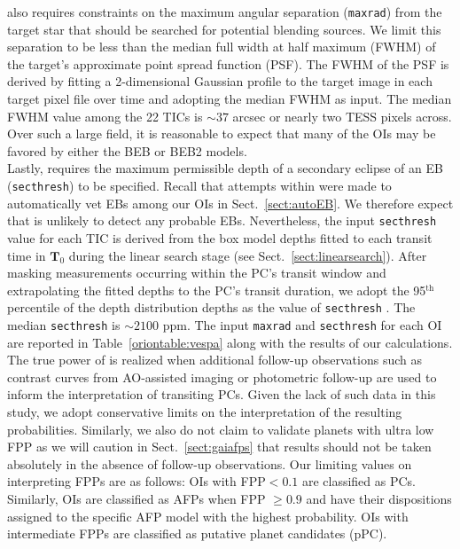\vespa{} also requires constraints on the maximum angular separation
(\texttt{maxrad}) from the target star that
should be searched for potential blending sources. We limit this separation to be less than the median
full width at half maximum (FWHM) of the target's approximate point spread function (PSF).
The FWHM of the PSF is derived by fitting a 2-dimensional Gaussian profile to the
target image in each target pixel file over time and adopting the median FWHM as \vespa{} input.
The median FWHM value among the 22 TICs is $\sim 37$ arcsec or nearly two TESS pixels across.
Over such a large field, it is reasonable to expect that many of the OIs may be favored by either the
BEB or BEB2 models. \\

Lastly, \vespa{} requires
the maximum permissible depth of a secondary eclipse of an EB (\texttt{secthresh}) to be specified.
Recall that attempts within \pipeline{} were made to automatically vet EBs among our OIs in
Sect.~\ref{sect:autoEB}.
We therefore expect that \vespa{} is unlikely to detect any probable EBs. Nevertheless, the input
\texttt{secthresh} value for each TIC is derived from
the box model depths fitted to each transit time in $\mathbf{T}_0$ during the linear search stage
(see Sect.~\ref{sect:linearsearch}). After masking measurements occurring within the PC's
transit window and extrapolating the fitted depths to the PC's transit duration,
we adopt the 95$^{\text{th}}$ percentile of the depth distribution depths as the value of \texttt{secthresh}
\citep{crossfield18}. The median \texttt{secthresh} is $\sim 2100$ ppm. The input \texttt{maxrad} and
\texttt{secthresh} for each OI are reported in Table~\ref{oriontable:vespa} along with the results of
our \vespa{} calculations. \\



The true power of \vespa{} is realized when additional follow-up observations such as 
contrast curves from AO-assisted imaging or photometric follow-up
are used to inform the interpretation of transiting PCs.
Given the lack of such data in this study, we adopt conservative limits on the interpretation of the
resulting \vespa{} probabilities. Similarly, we also do not claim to validate planets with ultra low FPP
\citep[$<0.01$; e.g.][]{montet15,crossfield18,livingston18} as we will caution in Sect.~\ref{sect:gaiafps}
that \vespa{} results should not be taken absolutely in the absence of follow-up
observations. Our limiting values on interpreting FPPs are as follows: OIs with FPP$<0.1$
are classified as PCs. Similarly, OIs are classified as AFPs when
FPP $\geq 0.9$ and have their dispositions assigned to the specific AFP model with the highest
probability. OIs with intermediate FPPs are classified as putative planet candidates (pPC). \\

